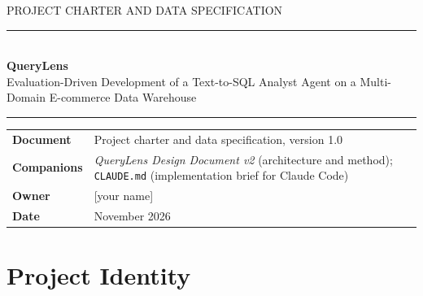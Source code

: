 \documentclass[11pt,a4paper]{article}
\newcommand{\code}[1]{\texttt{\small #1}}
\begin{document}
\begin{titlepage}
\thispagestyle{empty}
\vspace*{1.5cm}
{\color{grey}\large PROJECT CHARTER AND DATA SPECIFICATION}\\[6pt]
{\color{accent}\rule{\linewidth}{1.2pt}}\\[14pt]
{\fontsize{30}{36}\selectfont\bfseries QueryLens}\\[10pt]
{\Large Evaluation-Driven Development of a Text-to-SQL Analyst Agent on a Multi-Domain
E-commerce Data Warehouse}\\[10pt]
{\color{accent}\rule{\linewidth}{1.2pt}}

\vspace{1cm}
\begin{center}
\end{center}

\vfill
\begin{tabularx}{\linewidth}{@{}lX@{}}
\textbf{Document} & Project charter and data specification, version 1.0\\
\textbf{Companions} & \emph{QueryLens Design Document v2} (architecture and method); \code{CLAUDE.md} (implementation brief for Claude Code)\\
\textbf{Owner} & [your name]\\
\textbf{Date} & November 2026\\
\end{tabularx}
\end{titlepage}

\tableofcontents
\newpage

\section{Project Identity}
\end{document}
